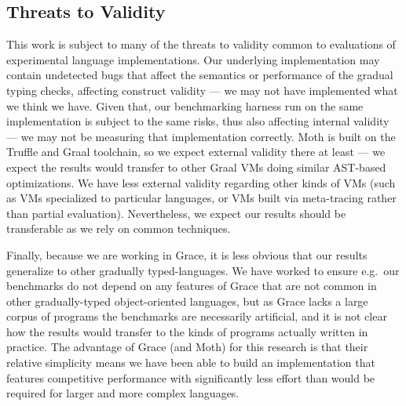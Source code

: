 \subsection{Threats to Validity}


This work is subject to many of the threats to validity common to
evaluations of experimental language implementations.  Our underlying
implementation may contain undetected bugs that affect the semantics
or performance of the gradual typing checks, affecting construct
validity --- we may not have implemented what we think we have. Given
that, our benchmarking harness run on the same implementation is
subject to the same risks, thus also affecting internal validity ---
we may not be measuring that implementation correctly.  Moth is built
on the Truffle and Graal toolchain, so we expect external validity
there at least --- we expect the results would transfer to other Graal
VMs doing similar AST-based optimizations.  We have less external
validity regarding other kinds of VMs (such as VMs specialized to 
particular languages, or VMs built via meta-tracing rather than partial evaluation). 
Nevertheless, we expect our results should be transferable
as we rely on common techniques.

Finally, because we are working in Grace, it is less obvious that our
results generalize to other gradually typed-languages. We have worked
to ensure e.g.\ our benchmarks do not depend on any features of Grace
that are not common in other gradually-typed object-oriented
languages, but as Grace lacks a large corpus of programs the
benchmarks are necessarily artificial, and it is not clear how the
results would transfer to the kinds of programs actually written in
practice. The advantage of Grace (and Moth) for this research is
that their relative simplicity means we have been able to build an
implementation that features competitive performance with significantly less
effort than would be required for larger and more complex languages.
